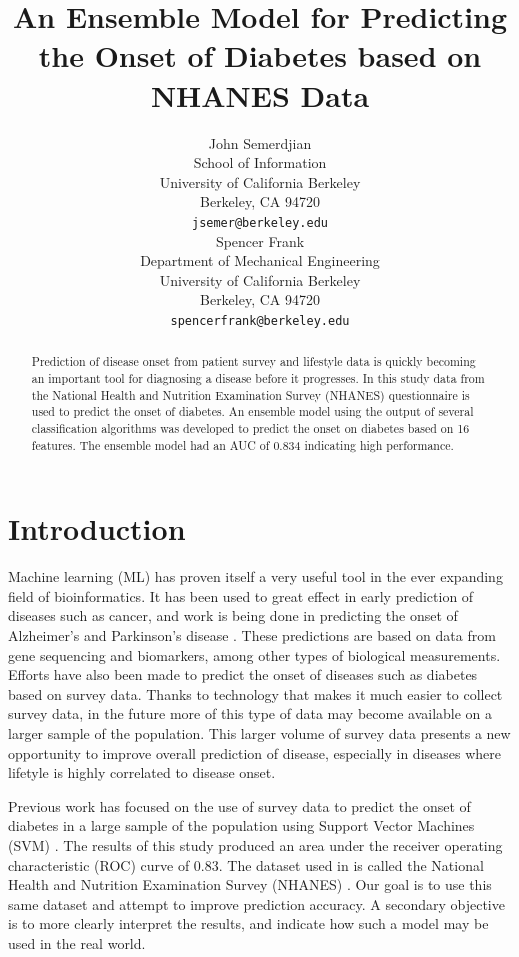 \documentclass{article} %
\title{An Ensemble Model for Predicting the Onset of Diabetes based on NHANES Data}
\author{ John Semerdjian \\
School of Information \\
University of California Berkeley\\
Berkeley, CA 94720 \\
\texttt{jsemer@berkeley.edu} \\
\And
Spencer Frank \\
Department of Mechanical Engineering\\
University of California Berkeley\\
Berkeley, CA 94720 \\
\texttt{spencerfrank@berkeley.edu} \\
}
\begin{document}
\maketitle

\begin{abstract}
Prediction of disease onset from patient survey and lifestyle data is quickly becoming an important tool for diagnosing a disease before it progresses. In this study data from the National Health and Nutrition Examination Survey (NHANES) questionnaire is used to predict the onset of diabetes. An ensemble model using the output of several classification algorithms was developed to predict the onset on diabetes based on 16 features. The ensemble model had an AUC of 0.834 indicating high performance. 

\end{abstract}

\section{Introduction}
Machine learning (ML) has proven itself a very useful tool in the ever expanding field of bioinformatics. It has been used to great effect in early prediction of diseases such as cancer\cite{capriotti_predicting_2006}, and work is being done in predicting the onset of Alzheimer's and Parkinson's disease \cite{capriotti_predicting_2006}. These predictions are based on data from gene sequencing and biomarkers, among other types of biological measurements. Efforts have also been made to predict the onset of diseases such as diabetes based on survey data. Thanks to technology that makes it much easier to collect survey data, in the future more of this type of data may become available on a larger sample of the population. This larger volume of survey data presents a new opportunity to improve overall prediction of disease, especially in diseases where lifetyle is  highly correlated to disease onset\cite{_reduction_2002}.

Previous work has focused on the use of survey data to predict the onset of diabetes in a large sample of the population using Support Vector Machines (SVM) \cite{yu_application_2010}. The results of this study produced an area under the receiver operating characteristic (ROC) curve of 0.83. The dataset used in \cite{yu_application_2010} is called the National Health and Nutrition Examination Survey (NHANES) \cite{center_for_disease_and_control_national_????}. Our goal is to use this same dataset and attempt to improve prediction accuracy. A secondary objective is to more clearly interpret the results, and indicate how such a model may be used in the real world.
\end{document}
